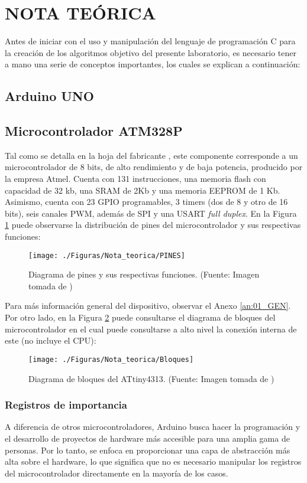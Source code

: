 \newpage
\section{NOTA TEÓRICA}

Antes de iniciar con el uso y manipulación del lenguaje de programación C para la creación de los algoritmos objetivo del presente laboratorio, es necesario tener a mano una serie de conceptos importantes, los cuales se explican a continuación: 

\subsection{Arduino UNO}
\subsection{Microcontrolador ATM328P}%
Tal como se detalla en la hoja del fabricante \cite{AT}, este componente corresponde a un microcontrolador de 8 bits, de alto rendimiento y de baja potencia, producido por la empresa Atmel. Cuenta con 131 instrucciones, una memoria flash con capacidad de 32 kb, una SRAM de 2Kb y una memoria EEPROM de 1 Kb. Asimismo, cuenta con 23 GPIO programables, 3 timers (dos de 8 y otro de 16 bits), seis canales PWM, además de SPI y una USART \textit{full duplex}. En la Figura \ref{fig:AT_pins} puede observarse la distribución de pines del microcontrolador y sus respectivas funciones:  

\begin{figure}[H]
\centering
\texttt{[image: ./Figuras/Nota\_teorica/PINES]}
\caption{Diagrama de pines y sus respectivas funciones. (Fuente: Imagen tomada de \cite{AT})}
\label{fig:AT_pins}
\end{figure}

 Para más información general del dispositivo, observar el Anexo \ref{an:01_GEN}. 
Por otro lado, en la Figura \ref{fig:DBLO} puede consultarse el diagrama de bloques del microcontrolador en el cual puede consultarse a alto nivel la conexión interna de este (no incluye el CPU):

\begin{figure}[H]
\centering
\texttt{[image: ./Figuras/Nota\_teorica/Bloques]}
\caption{Diagrama de bloques del ATtiny4313. (Fuente: Imagen tomada de \cite{AT})}
\label{fig:DBLO}
\end{figure}



\subsubsection{Registros de importancia}
  A diferencia de otros microcontroladores, Arduino busca hacer la programación y el desarrollo de proyectos de hardware más accesible para una amplia gama de personas. Por lo tanto, se enfoca en proporcionar una capa de abstracción más alta sobre el hardware, lo que significa que no es necesario manipular los registros del microcontrolador directamente en la mayoría de los casos.

